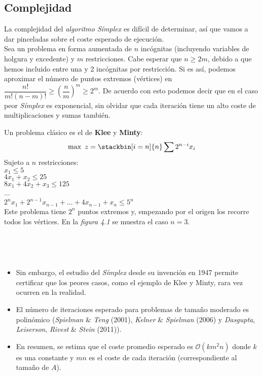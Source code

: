 \subsection{Complejidad}
La complejidad del \textit{algoritmo Símplex} es difícil de determinar, así que vamos a dar pinceladas sobre el coste esperado de ejecución.\\

Sea un problema en forma aumentada de $n$ incógnitas (incluyendo variables de holgura y excedente) y $m$ restricciones. Cabe esperar que $n\geq 2m$, debido a que hemos incluido entre una y 2 incógnitas por restricción. Si es así, podemos aproximar el número de puntos extremos (vértices) en $\dfrac{n!}{m!(n-m)!}\geq\left(\dfrac{n}{m}\right)^m\geq 2^m$.
De acuerdo con esto podemos decir que en el caso peor \textit{Símplex} es exponencial, sin olvidar que cada iteración tiene un alto coste de multiplicaciones y sumas también.

\begin{ejem} Un problema clásico es el de \textbf{Klee} y \textbf{Minty}:
\[\max\ z= \stackbin[i=n]{n}\sum 2^{n-i}x_i\]
Sujeto a $n$ restricciones:\\
$x_1\leq 5$\\
$4x_1+x_2\leq25$\\
$8x_1+4x_2+x_3\leq125$\\
...\\
$2^nx_1+2^{n-1}x_{n-1}+...+4x_{n-1}+x_n\leq5^n$\\

Este problema tiene $2^n$ puntos extremos y, empezando por el origen los recorre todos los vértices. En la \textit{figura 4.1} se muestra el caso $n=3$.
\begin{figura}\ \begin{center}\end{center}\end{figura}
\end{ejem}

\begin{observacion}\ 
\begin{itemize}
\item Sin embargo, el estudio del \textit{Símplex} desde su invención en 1947 permite certificar que los peores casos, como el ejemplo de Klee y Minty, rara vez ocurren en la realidad.
\item El número de iteraciones esperado para problemas de tamaño moderado es polinómico (\textit{Spielman} \& \textit{Teng} (2001), \textit{Kelner} \& \textit{Spielman} (2006) y \textit{Dasgupta}, \textit{Leiserson}, \textit{Rivest} \& \textit{Stein} (2011)).
\item En resumen, se estima que el coste promedio esperado es $\mathcal{O}(km^2n)$ donde $k$ es una constante y $mn$ es el coste de cada iteración (correspondiente al tamaño de $A$).
\end{itemize}
\end{observacion}
